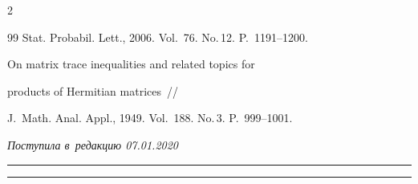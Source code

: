 \begin{multicols}{2}
{{\begin{thebibliography}{99}
Stat. Probabil. Lett., 2006. Vol.~76. No.\,12. P.~1191--1200.







  On matrix trace inequalities and related topics for 


products of Hermitian matrices~//


J.~Math. Anal. Appl., 1949. Vol.~188. No.\,3. P.~999--1001.


\end{thebibliography}





}


}





\end{multicols}





\vspace*{-3pt}





\hfill{\small\textit{Поступила в~редакцию 07.01.2020}}





\vspace*{8pt}




















\hrule





\vspace*{2pt}





\hrule










